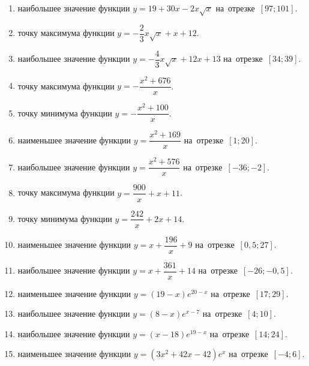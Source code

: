 \documentclass[a4paper,10pt]{article}
\begin{document}
\begin{enumerate}
\item {} наибольшее значение функции $y=19+30x -2x\sqrt{x}$ на~отрезке~$\left[97;101\right]$.

\item {} точку максимума функции $y=-\dfrac{2}{3}x\sqrt{x} +x+12$.

\item {} наибольшее значение функции $y=-\dfrac{4}{3}x\sqrt{x} +12x+13$ на~отрезке~$\left[34;39\right]$.

\item {} точку максимума функции $y=-\dfrac{x^2 +676}{x}$.

\item {} точку минимума функции $y=-\dfrac{x^2 +100}{x}$.

\item {} наименьшее значение функции $y=\dfrac{x^2 +169}{x}$ на~отрезке~$\left[1;20\right]$.

\item {} наибольшее значение функции $y=\dfrac{x^2 +576}{x}$ на~отрезке~$\left[-36;-2\right]$.

\item {} точку максимума функции $y=\dfrac{900}{x} +x+11$.

\item {} точку минимума функции $y=\dfrac{242}{x} +2x+14$.

\item {} наименьшее значение функции $y=x+\dfrac{196}{x} +9$ на~отрезке~$\left[0,5;27\right]$.

\item {} наибольшее значение функции $y=x+\dfrac{361}{x} +14$ на~отрезке~$\left[-26;-0,5\right]$.

\item {} наименьшее значение функции $y=\left(19-x\right)e^{20-x}$ на~отрезке~$\left[17;29\right]$.

\item {} наибольшее значение функции $y=\left(8-x\right)e^{x-7}$ на~отрезке~$\left[4;10\right]$.

\item {} наибольшее значение функции $y=\left(x-18\right)e^{19-x}$ на~отрезке~$\left[14;24\right]$.

\item {} наименьшее значение функции $y=\left(3x^2 +42x -42\right)e^{x }$ на~отрезке~$\left[-4;6\right]$.


\end{enumerate}
\end{document}
